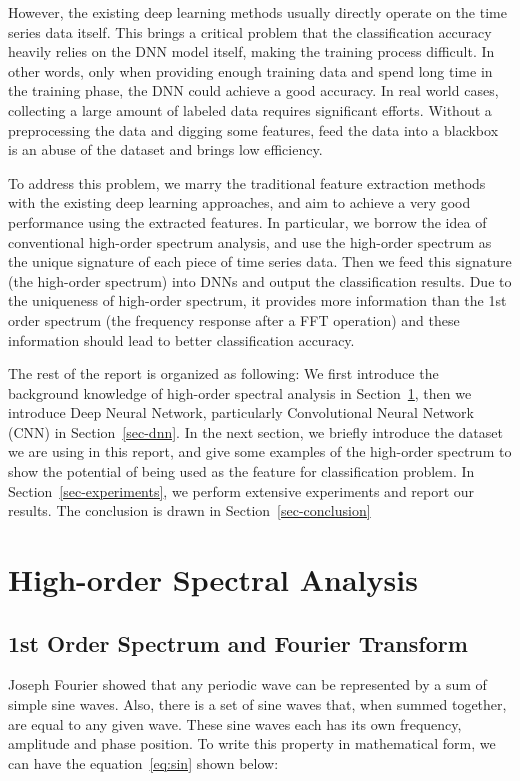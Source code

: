 \documentclass[letterpaper,12pt]{article}
\begin{document}
However, the existing deep learning methods usually directly operate on the time series data itself. This brings a critical problem that the classification accuracy heavily relies on the DNN model itself, making the training process difficult. In other words, only when providing enough training data and spend long time in the training phase, the DNN could achieve a good accuracy.
In real world cases, collecting a large amount of labeled data requires significant efforts. Without a preprocessing the data and digging some features, feed the data into a blackbox is an abuse of the dataset and brings low efficiency.

To address this problem, we marry the traditional feature extraction methods with the existing deep learning approaches, and aim to achieve a very good performance using the extracted features. In particular, we borrow the idea of conventional high-order spectrum analysis, and use the high-order spectrum as the unique signature of each piece of time series data. Then we feed this signature (the high-order spectrum) into DNNs and output the classification results. Due to the uniqueness of high-order spectrum, it provides more information than the 1st order spectrum (the frequency response after a FFT operation) and these information should lead to better classification accuracy.

The rest of the report is organized as following:
We first introduce the background knowledge of high-order spectral analysis in Section~\ref{sec-theory}, then we introduce Deep Neural Network, particularly Convolutional Neural Network (CNN) in Section~\ref{sec-dnn}. In the next section, we briefly introduce the dataset we are using in this report, and give some examples of the high-order spectrum to show the potential of being used as the feature for classification problem. In Section~\ref{sec-experiments}, we perform extensive experiments and report our results. The conclusion is drawn in Section~\ref{sec-conclusion}


\section{High-order Spectral Analysis}
\label{sec-theory}
\subsection{1st Order Spectrum and Fourier Transform}

Joseph Fourier showed that any periodic wave can be represented by a sum of simple sine waves. Also, there is a set of sine waves that, when summed together, are equal to any given wave\cite{neto_2018}. These sine waves each has its own frequency, amplitude and phase position. To write this property in mathematical form, we can have the equation~\ref{eq:sin} shown below\cite{stoica1997introduction}:
\end{document}
